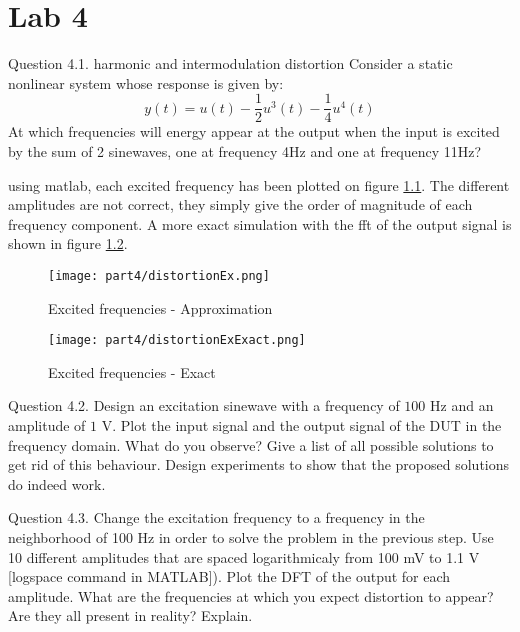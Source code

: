 \setcounter{secnumdepth}{1}

\chapter{Lab 4}

\begin{Task}{Question 4.1. harmonic and intermodulation distortion}
    Consider a static nonlinear system whose response is given by:\\
    \begin{equation}
        y(t) = u(t) - \frac{1}{2}u^3(t) - \frac{1}{4} u^4(t)
    \end{equation}
    At which frequencies will energy appear at the output when the input is excited by the sum of 2 sinewaves, one at frequency 4Hz and one at frequency 11Hz?    
\end{Task}

using matlab, each excited frequency has been plotted on figure \ref{fig:distortionEx}. The different amplitudes are not correct, they simply give the order of magnitude of each frequency component. A more exact simulation with the fft of the output signal is shown in figure \ref{fig:distortionExExact}.

\begin{figure}[H]
    \centering
    \texttt{[image: part4/distortionEx.png]}
    \caption{Excited frequencies - Approximation}
    \label{fig:distortionEx}
\end{figure}

\begin{figure}[H]
    \centering
    \texttt{[image: part4/distortionExExact.png]}
    \caption{Excited frequencies - Exact}
    \label{fig:distortionExExact}
\end{figure}

\begin{Task}{Question 4.2.}
    Design an excitation sinewave with a frequency of $100$ Hz and an amplitude of $1$ V. Plot the input signal and the output signal of the DUT in the frequency domain. What do you observe? Give a list of all possible solutions to get rid of this behaviour. Design experiments to show that the proposed solutions do indeed work.
\end{Task}

\begin{Task}{Question 4.3.}
    Change the excitation frequency to a frequency in the neighborhood of 100 Hz in order to solve the problem in the previous step. Use 10 different amplitudes that are spaced logarithmicaly from 100 mV to 1.1 V [logspace command in MATLAB]). Plot the DFT of the output for each amplitude. What are the frequencies at which you expect distortion to appear? Are they all present in reality? Explain.
\end{Task}

